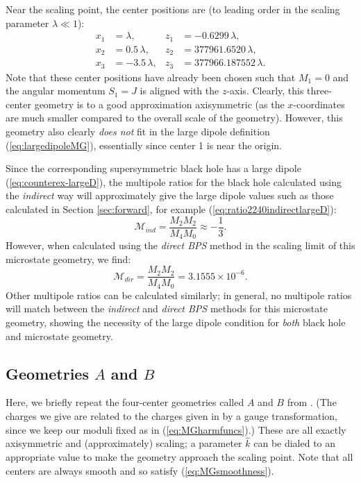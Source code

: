 \documentclass[12pt,a4paper]{article}
\newcommand{\be}{\begin{equation}}
\newcommand{\ee}{\end{equation}}
\def\indirect{\emph{indirect} }
\def\direct{\emph{direct BPS} }
\begin{document}
Near the scaling point, the center positions are (to leading order in the scaling parameter $\lambda\ll 1$):
\be \begin{aligned}
  x_1 &= \lambda, & z_1 &= -0.6299\, \lambda,\\
  x_2 &= 0.5\, \lambda, & z_2 &= 377961.6520\, \lambda,\\
  x_3 &= -3.5\, \lambda, & z_3 &= 377966.187552\,\lambda.
 \end{aligned}\ee
 Note that these center positions have already been chosen such that $M_1=0$ and the angular momentum $S_1=J$ is aligned with the $z$-axis.
Clearly, this three-center geometry is to a good approximation axisymmetric (as the $x$-coordinates are much smaller compared to the overall scale of the geometry). However, this geometry also clearly \emph{does not} fit in the large dipole definition (\ref{eq:largedipoleMG}), essentially since center 1 is near the origin.

Since the corresponding supersymmetric black hole has a large dipole (\ref{eq:counterex-largeD}), the multipole ratios for the black hole calculated using the \indirect way will approximately give the large dipole values such as those calculated in Section \ref{sec:forward}, for example (\ref{eq:ratio2240indirectlargeD}):
\be \mathcal{M}_{ind} = \frac{M_2M_2}{M_4M_0} \approx -\frac13.\ee
However, when calculated using the \direct method in the scaling limit of this microstate geometry, we find:
\be \mathcal{M}_{dir} = \frac{M_2M_2}{M_4M_0} = 3.1555\times 10^{-6}.\ee
Other multipole ratios can be calculated similarly; in general, no multipole ratios will match between the \indirect and \direct methods for this microstate geometry, showing the necessity of the large dipole condition for \emph{both} black hole and microstate geometry.



\subsection{Geometries \texorpdfstring{$A$}{A} and \texorpdfstring{$B$}{B}}\label{sec:geometriesAB}
Here, we briefly repeat the four-center geometries called $A$ and $B$ from \cite{Bena:2020uup}. (The charges we give are related to the charges given in \cite{Bena:2020uup} by a gauge transformation, since we keep our moduli fixed as in (\ref{eq:MGharmfuncs}).) These are all exactly axisymmetric and (approximately) scaling; a parameter $\hat{k}$ can be dialed to an appropriate value to make the geometry approach the scaling point. Note that all centers are always smooth and so satisfy (\ref{eq:MGsmoothness}).
\end{document}
